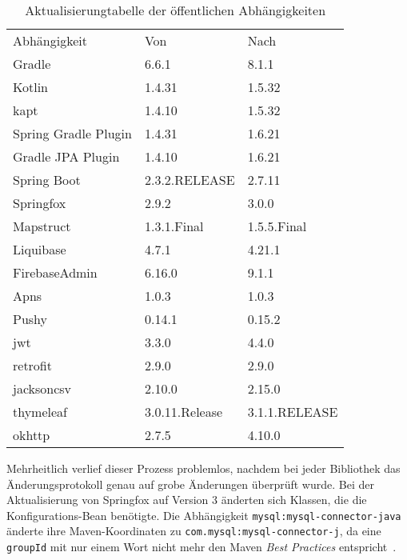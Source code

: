 \begin{table}[h]
\caption{Aktualisierungtabelle der öffentlichen Abhängigkeiten}
\label{tab:public_versions}
\begin{tabular}{lll}
Abhängigkeit         & Von            & Nach          \\
Gradle               & 6.6.1          & 8.1.1         \\
Kotlin               & 1.4.31         & 1.5.32        \\
kapt                 & 1.4.10         & 1.5.32        \\
Spring Gradle Plugin & 1.4.31         & 1.6.21        \\
Gradle JPA Plugin    & 1.4.10         & 1.6.21        \\
Spring Boot          & 2.3.2.RELEASE  & 2.7.11        \\
Springfox            & 2.9.2          & 3.0.0         \\
Mapstruct            & 1.3.1.Final    & 1.5.5.Final   \\
Liquibase            & 4.7.1          & 4.21.1        \\
FirebaseAdmin        & 6.16.0         & 9.1.1         \\
Apns                 & 1.0.3          & 1.0.3         \\
Pushy                & 0.14.1         & 0.15.2        \\
jwt                  & 3.3.0          & 4.4.0         \\
retrofit             & 2.9.0          & 2.9.0         \\
jacksoncsv           & 2.10.0         & 2.15.0        \\
thymeleaf            & 3.0.11.Release & 3.1.1.RELEASE \\
okhttp               & 2.7.5          & 4.10.0       
\end{tabular}
\end{table}

Mehrheitlich verlief dieser Prozess problemlos, nachdem bei jeder Bibliothek das Änderungsprotokoll genau auf grobe Änderungen überprüft wurde. Bei der Aktualisierung von Springfox auf Version 3 änderten sich Klassen, die die Konfigurations-Bean benötigte. Die Abhängigkeit \texttt{mysql:mysql-connector-java} änderte ihre Maven-Koordinaten zu \texttt{com.mysql:mysql-connector-j}, da eine \texttt{groupId} mit nur einem Wort nicht mehr den Maven \textit{Best Practices} entspricht~\parencite{mavenmysql}.

